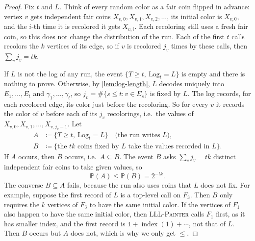 \begin{proof}
    Fix \(t\) and \(L\). Think of every random color as a fair coin flipped in advance: vertex \(v\) gets independent fair coins \(X_{v, 0}, X_{v, 1}, X_{v, 2}, \ldots\), its initial color is \(X_{v, 0}\), and the \(i\)-th time it is recolored it gets \(X_{v, i}\). Each recoloring still uses a fresh fair coin, so this does not change the distribution of the run. Each of the first \(t\) calls recolors the \(k\) vertices of its edge, so if \(v\) is recolored \(j_{v}\) times by these calls, then \(\sum_{v} j_{v} = tk\).

    If \(L\) is not the log of any run, the event \(\{ T \ge t, \ \mathrm{Log}_{t} = L \}\) is empty and there is nothing to prove. Otherwise, by \autoref{lem:log-length}, \(L\) decodes uniquely into \(E_{1}, \ldots, E_{t}\) and \(\gamma_{1}, \ldots, \gamma_{t}\), so \(j_{v} = \#\{ s \le t : v \in E_{s} \}\) is fixed by \(L\). The log records, for each recolored edge, its color just before the recoloring. So for every \(v\) it records the color of \(v\) before each of its \(j_{v}\) recolorings, i.e.\ the values of \(X_{v, 0}, X_{v, 1}, \ldots, X_{v, j_{v} - 1}\). Let
    \begin{align*}
        A &\coloneqq \{ T \ge t, \ \mathrm{Log}_{t} = L \} \quad \text{(the run writes \(L\))}, \\
        B &\coloneqq \{ \text{the \(tk\) coins fixed by \(L\) take the values recorded in \(L\)} \} .
    \end{align*}
    If \(A\) occurs, then \(B\) occurs, i.e.\ \(A \subseteq B\). The event \(B\) asks \(\sum_{v} j_{v} = tk\) distinct independent fair coins to take given values, so
    \[
        \mathbb{P}(A) \le \mathbb{P}(B) = 2^{-tk} .
    \]
    The converse \(B \subseteq A\) fails, because the run also uses coins that \(L\) does not fix. For example, suppose the first record of \(L\) is a top-level call on \(F_{3}\). Then \(B\) only requires the \(k\) vertices of \(F_{3}\) to have the same initial color. If the vertices of \(F_{1}\) also happen to have the same initial color, then \textsc{LLL-Painter} calls \(F_{1}\) first, as it has smaller index, and the first record is \(\texttt{1} + \operatorname{index}(1) + \cdots\), not that of \(L\). Then \(B\) occurs but \(A\) does not, which is why we only get \(\le\).
\end{proof}


